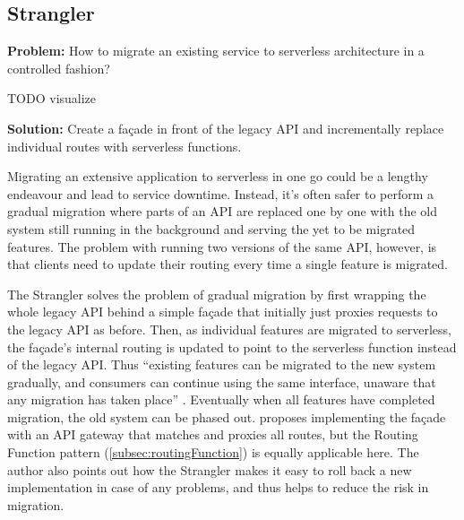 \subsection{Strangler} \label{subsec:strangler}

\textbf{Problem:} How to migrate an existing service to serverless architecture in a controlled fashion?

TODO visualize

\textbf{Solution:} Create a façade in front of the legacy API and incrementally replace individual routes with serverless functions.

Migrating an extensive application to serverless in one go could be a lengthy endeavour and lead to service downtime. Instead, it's often safer to perform a gradual migration where parts of an API are replaced one by one with the old system still running in the background and serving the yet to be migrated features. The problem with running two versions of the same API, however, is that clients need to update their routing every time a single feature is migrated. \parencite{microsoft18cloudPatterns}

The Strangler solves the problem of gradual migration by first wrapping the whole legacy API behind a simple façade that initially just proxies requests to the legacy API as before. Then, as individual features are migrated to serverless, the façade's internal routing is updated to point to the serverless function instead of the legacy API. Thus ``existing features can be migrated to the new system gradually, and consumers can continue using the same interface, unaware that any migration has taken place'' \parencite{microsoft18cloudPatterns}. Eventually when all features have completed migration, the old system can be phased out. \textcite{zambrano18patterns} proposes implementing the façade with an API gateway that matches and proxies all routes, but the Routing Function pattern (\ref{subsec:routingFunction}) is equally applicable here. The author also points out how the Strangler makes it easy to roll back a new implementation in case of any problems, and thus helps to reduce the risk in migration.


